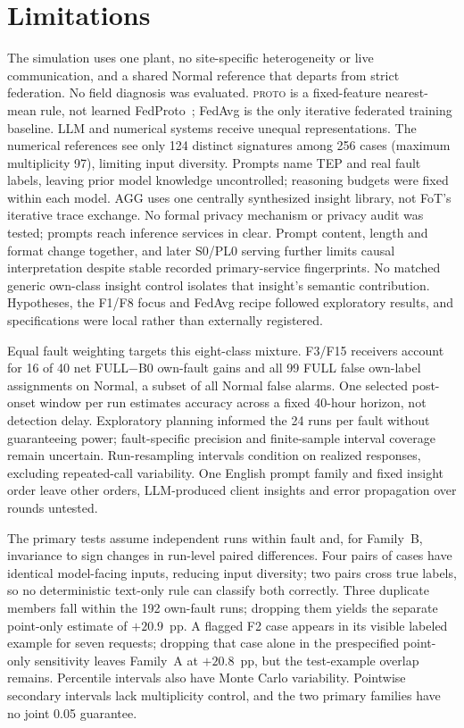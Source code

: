 \documentclass[conference]{IEEEtran}
\newcommand{\PROTO}{\textsc{proto}}
\newcommand{\cond}[1]{\textsf{#1}}
\begin{document}
\section{Limitations}
\label{sec:limits}
The simulation uses one plant, no site-specific heterogeneity or live communication, and a shared Normal reference that departs from strict federation. No field diagnosis was evaluated. \PROTO{} is a fixed-feature nearest-mean rule, not learned FedProto~\cite{tan2022fedproto}; FedAvg is the only iterative federated training baseline. LLM and numerical systems receive unequal representations. The numerical references see only 124 distinct signatures among 256 cases (maximum multiplicity 97), limiting input diversity. Prompts name TEP and real fault labels, leaving prior model knowledge uncontrolled; reasoning budgets were fixed within each model. \cond{AGG} uses one centrally synthesized insight library, not FoT's iterative trace exchange. No formal privacy mechanism or privacy audit was tested; prompts reach inference services in clear. Prompt content, length and format change together, and later \cond{S0}/\cond{PL0} serving further limits causal interpretation despite stable recorded primary-service fingerprints. No matched generic own-class insight control isolates that insight's semantic contribution. Hypotheses, the F1/F8 focus and FedAvg recipe followed exploratory results, and specifications were local rather than externally registered.

Equal fault weighting targets this eight-class mixture. F3/F15 receivers account for 16 of 40 net \cond{FULL}$-$\cond{B0} own-fault gains and all 99 \cond{FULL} false own-label assignments on Normal, a subset of all Normal false alarms. One selected post-onset window per run estimates accuracy across a fixed 40-hour horizon, not detection delay. Exploratory planning informed the 24 runs per fault without guaranteeing power; fault-specific precision and finite-sample interval coverage remain uncertain. Run-resampling intervals condition on realized responses, excluding repeated-call variability. One English prompt family and fixed insight order leave other orders, LLM-produced client insights and error propagation over rounds untested.

The primary tests assume independent runs within fault and, for Family~B, invariance to sign changes in run-level paired differences. Four pairs of cases have identical model-facing inputs, reducing input diversity; two pairs cross true labels, so no deterministic text-only rule can classify both correctly. Three duplicate members fall within the 192 own-fault runs; dropping them yields the separate point-only estimate of $+20.9$~pp. A flagged F2 case appears in its visible labeled example for seven requests; dropping that case alone in the prespecified point-only sensitivity leaves Family~A at $+20.8$~pp, but the test-example overlap remains. Percentile intervals also have Monte Carlo variability. Pointwise secondary intervals lack multiplicity control, and the two primary families have no joint 0.05 guarantee.
\end{document}
